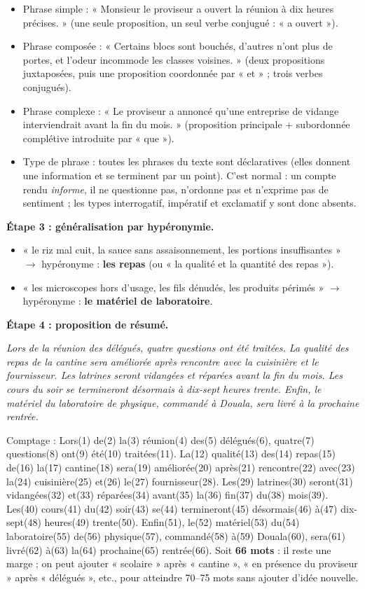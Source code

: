 \documentclass[11pt]{article}
\newcommand{\cle}[1]{{\popxbold\color{popdark}#1}}
\begin{document}
\begin{exoresolu}
\begin{itemize}
\item Phrase simple : « Monsieur le proviseur a ouvert la réunion à dix heures précises. » (une seule proposition, un seul verbe conjugué : « a ouvert »).
\item Phrase composée : « Certains blocs sont bouchés, d'autres n'ont plus de portes, et l'odeur incommode les classes voisines. » (deux propositions juxtaposées, puis une proposition coordonnée par « et » ; trois verbes conjugués).
\item Phrase complexe : « Le proviseur a annoncé qu'une entreprise de vidange interviendrait avant la fin du mois. » (proposition principale + subordonnée complétive introduite par « que »).
\item Type de phrase : toutes les phrases du texte sont \cle{déclaratives} (elles donnent une information et se terminent par un point). C'est normal : un compte rendu \emph{informe}, il ne questionne pas, n'ordonne pas et n'exprime pas de sentiment ; les types interrogatif, impératif et exclamatif y sont donc absents.
\end{itemize}

\textbf{Étape 3 : généralisation par hypéronymie.}

\begin{itemize}
\item « le riz mal cuit, la sauce sans assaisonnement, les portions insuffisantes » $\rightarrow$ hypéronyme : \textbf{les repas} (ou « la qualité et la quantité des repas »).
\item « les microscopes hors d'usage, les fils dénudés, les produits périmés » $\rightarrow$ hypéronyme : \textbf{le matériel de laboratoire}.
\end{itemize}

\textbf{Étape 4 : proposition de résumé.}

\emph{Lors de la réunion des délégués, quatre questions ont été traitées. La qualité des repas de la cantine sera améliorée après rencontre avec la cuisinière et le fournisseur. Les latrines seront vidangées et réparées avant la fin du mois. Les cours du soir se termineront désormais à dix-sept heures trente. Enfin, le matériel du laboratoire de physique, commandé à Douala, sera livré à la prochaine rentrée.}

Comptage : Lors(1) de(2) la(3) réunion(4) des(5) délégués(6), quatre(7) questions(8) ont(9) été(10) traitées(11). La(12) qualité(13) des(14) repas(15) de(16) la(17) cantine(18) sera(19) améliorée(20) après(21) rencontre(22) avec(23) la(24) cuisinière(25) et(26) le(27) fournisseur(28). Les(29) latrines(30) seront(31) vidangées(32) et(33) réparées(34) avant(35) la(36) fin(37) du(38) mois(39). Les(40) cours(41) du(42) soir(43) se(44) termineront(45) désormais(46) à(47) dix-sept(48) heures(49) trente(50). Enfin(51), le(52) matériel(53) du(54) laboratoire(55) de(56) physique(57), commandé(58) à(59) Douala(60), sera(61) livré(62) à(63) la(64) prochaine(65) rentrée(66). Soit \textbf{66 mots} : il reste une marge ; on peut ajouter « scolaire » après « cantine », « en présence du proviseur » après « délégués », etc., pour atteindre 70--75 mots sans ajouter d'idée nouvelle.


\end{exoresolu}
\end{document}
